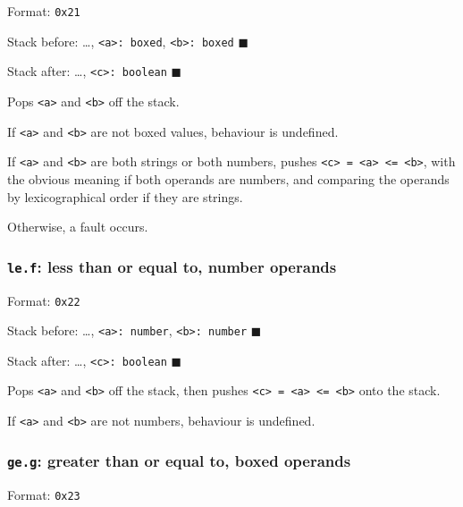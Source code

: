 Format: \texttt{0x21}

Stack before: \ldots, \texttt{\textless{}a\textgreater{}:\ boxed},
\texttt{\textless{}b\textgreater{}:\ boxed} \(\blacksquare\)

Stack after: \ldots, \texttt{\textless{}c\textgreater{}:\ boolean}
\(\blacksquare\)

Pops \texttt{\textless{}a\textgreater{}} and
\texttt{\textless{}b\textgreater{}} off the stack.

If \texttt{\textless{}a\textgreater{}} and
\texttt{\textless{}b\textgreater{}} are not boxed values, behaviour is
undefined.

If \texttt{\textless{}a\textgreater{}} and
\texttt{\textless{}b\textgreater{}} are both strings or both numbers,
pushes
\texttt{\textless{}c\textgreater{}\ =\ \textless{}a\textgreater{}\ \textless{}=\ \textless{}b\textgreater{}},
with the obvious meaning if both operands are numbers, and comparing the
operands by lexicographical order if they are strings.

Otherwise, a fault occurs.

\subsubsection{\texorpdfstring{\texttt{le.f}: less than or equal to,
number operands}{le.f: less than or equal to, number operands}}

Format: \texttt{0x22}

Stack before: \ldots, \texttt{\textless{}a\textgreater{}:\ number},
\texttt{\textless{}b\textgreater{}:\ number} \(\blacksquare\)

Stack after: \ldots, \texttt{\textless{}c\textgreater{}:\ boolean}
\(\blacksquare\)

Pops \texttt{\textless{}a\textgreater{}} and
\texttt{\textless{}b\textgreater{}} off the stack, then pushes
\texttt{\textless{}c\textgreater{}\ =\ \textless{}a\textgreater{}\ \textless{}=\ \textless{}b\textgreater{}}
onto the stack.

If \texttt{\textless{}a\textgreater{}} and
\texttt{\textless{}b\textgreater{}} are not numbers, behaviour is
undefined.

\subsubsection{\texorpdfstring{\texttt{ge.g}: greater than or equal to,
boxed operands}{ge.g: greater than or equal to, boxed operands}}

Format: \texttt{0x23}

